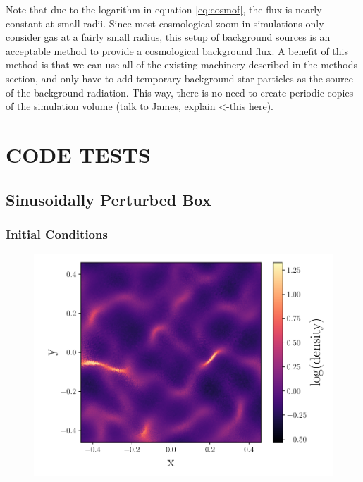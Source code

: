 \documentclass[fleq,usenatbib]{mnras}
\begin{document}
Note that due to the logarithm in equation \ref{eq:cosmof}, the flux is nearly 
constant at small radii. Since most cosmological zoom in simulations only 
consider gas at a fairly small radius, this setup of background sources is an 
acceptable method to provide a cosmological background flux. A benefit of this 
method is that we can use all of the existing machinery described in the 
methods section, and only have to add temporary background star particles as 
the source of the background radiation. This way, there is no need to create 
periodic copies of the simulation volume (talk to James, explain <-this here).

\section{CODE TESTS}\label{sec:tsts}
\subsection{Sinusoidally Perturbed Box}
\subsubsection{Initial Conditions}
\begin{figure}
\includegraphics[width=1\linewidth]{Figures/sine_rho.pdf}
\caption{}
\label{fig:sine_rho}
\end{figure}
\end{document}
